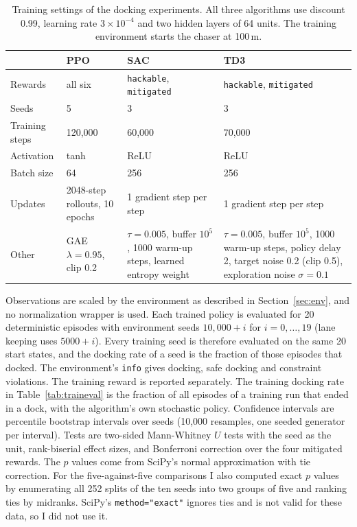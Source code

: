 \documentclass[11pt]{article}
\begin{document}
\begin{table}[t]
\centering
\small
\caption{Training settings of the docking experiments. All three algorithms use
discount 0.99, learning rate $3\times10^{-4}$ and two hidden layers of 64 units.
The training environment starts the chaser at 100\,m.}
\label{tab:settings}
\begin{tabular}{p{2.2cm}p{3.7cm}p{4.3cm}p{4.3cm}}
\toprule
 & PPO & SAC & TD3 \\
\midrule
Rewards & all six & \texttt{hackable}, \texttt{mitigated} & \texttt{hackable}, \texttt{mitigated} \\
Seeds & 5 & 3 & 3 \\
Training steps & 120,000 & 60,000 & 70,000 \\
Activation & tanh & ReLU & ReLU \\
Batch size & 64 & 256 & 256 \\
Updates & 2048-step rollouts, 10 epochs & 1 gradient step per step & 1 gradient step per step \\
Other & GAE $\lambda=0.95$, clip 0.2 & $\tau=0.005$, buffer $10^5$, 1000 warm-up steps, learned entropy weight & $\tau=0.005$, buffer $10^5$, 1000 warm-up steps, policy delay 2, target noise 0.2 (clip 0.5), exploration noise $\sigma=0.1$ \\
\bottomrule
\end{tabular}
\end{table}

Observations are scaled by the environment as described in
Section~\ref{sec:env}, and no normalization wrapper is used. Each trained
policy is evaluated for 20 deterministic episodes with environment seeds
$10{,}000+i$ for $i=0,\dots,19$ (lane keeping uses $5000+i$). Every training seed
is therefore evaluated on the same 20 start states, and the docking rate of a
seed is the fraction of those episodes that docked. The environment's
\texttt{info} gives docking, safe docking and constraint violations. The
training reward is reported separately. The training docking rate in
Table~\ref{tab:traineval} is the fraction of all episodes of a training run that
ended in a dock, with the algorithm's own stochastic policy. Confidence
intervals are percentile bootstrap intervals over seeds (10,000 resamples, one
seeded generator per interval). Tests are two-sided Mann-Whitney $U$ tests with
the seed as the unit, rank-biserial effect sizes, and Bonferroni correction over
the four mitigated rewards. The $p$ values come from SciPy's normal
approximation with tie correction. For the five-against-five comparisons I also
computed exact $p$ values by enumerating all 252 splits of the ten seeds into two
groups of five and ranking ties by midranks. SciPy's \texttt{method="exact"}
ignores ties and is not valid for these data, so I did not use it.
\end{document}
